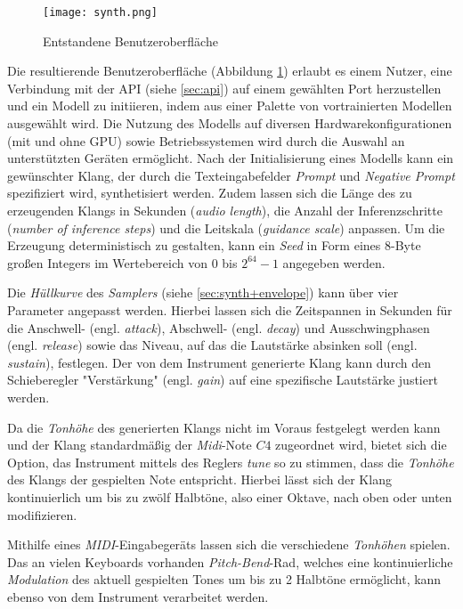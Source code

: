 \documentclass[
  a4paper,  %
  twoside,  %
  bibliography=totoc,
  headsepline,
  cleardoublepage=empty,
  parskip=half,
  draft=false
]{scrbook}
\begin{document}
\begin{figure}[h]
  \centering
  \texttt{[image: synth.png]}
  \caption[Benutzeroberfläche]{Entstandene Benutzeroberfläche}
  \label{fig:synth}
\end{figure} 

Die resultierende Benutzeroberfläche (Abbildung \ref{fig:synth}) erlaubt es einem Nutzer, eine Verbindung mit der API (siehe \ref{sec:api}) auf einem gewählten Port herzustellen und ein Modell zu initiieren, indem aus einer Palette von vortrainierten Modellen ausgewählt wird. Die Nutzung des Modells auf diversen Hardwarekonfigurationen (mit und ohne GPU) sowie Betriebssystemen wird durch die Auswahl an unterstützten Geräten ermöglicht. Nach der Initialisierung eines Modells kann ein gewünschter Klang, der durch die Texteingabefelder \emph{Prompt} und \emph{Negative Prompt} spezifiziert wird, synthetisiert werden. Zudem lassen sich die Länge des zu erzeugenden Klangs in Sekunden (\emph{audio length}), die Anzahl der Inferenzschritte (\emph{number of inference steps}) und die Leitskala (\emph{guidance scale}) anpassen. Um die Erzeugung deterministisch zu gestalten, kann ein \emph{Seed} in Form eines 8-Byte großen Integers im Wertebereich von $0$ bis $2^{64}-1$ angegeben werden.

Die \emph{Hüllkurve} des \emph{Samplers} (siehe \ref{sec:synth+envelope}) kann über vier Parameter angepasst werden. Hierbei lassen sich die Zeitspannen in Sekunden für die Anschwell- (engl. \emph{attack}), Abschwell- (engl. \emph{decay}) und Ausschwingphasen (engl. \emph{release}) sowie das Niveau, auf das die Lautstärke absinken soll (engl. \emph{sustain}), festlegen. Der von dem Instrument generierte Klang kann durch den Schieberegler "Verstärkung" (engl. \emph{gain}) auf eine spezifische Lautstärke justiert werden.

Da die \emph{Tonhöhe} des generierten Klangs nicht im Voraus festgelegt werden kann und der Klang standardmäßig der \emph{Midi}-Note $C4$ zugeordnet wird, bietet sich die Option, das Instrument mittels des Reglers \emph{tune} so zu stimmen, dass die \emph{Tonhöhe} des Klangs der gespielten Note entspricht. Hierbei lässt sich der Klang kontinuierlich um bis zu zwölf Halbtöne, also einer Oktave, nach oben oder unten modifizieren.

Mithilfe eines \emph{MIDI}-Eingabegeräts lassen sich die verschiedene \emph{Tonhöhen} spielen. Das an vielen Keyboards vorhanden \emph{Pitch-Bend}-Rad, welches eine kontinuierliche \emph{Modulation} des aktuell gespielten Tones um bis zu 2 Halbtöne ermöglicht, kann ebenso von dem Instrument verarbeitet werden. 
\end{document}
